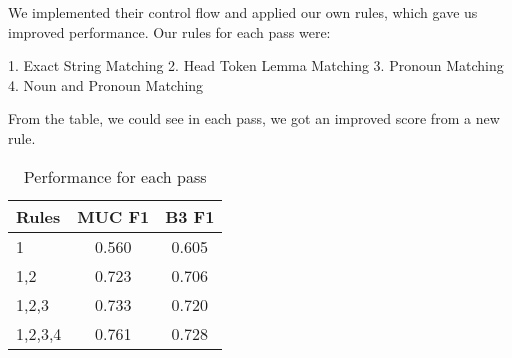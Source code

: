 \documentclass[12pt, twocolumn]{article}
\begin{document}
We implemented their control flow and applied our own rules, which gave us improved performance. Our rules for each pass were:

1. Exact String Matching
2. Head Token Lemma Matching
3. Pronoun Matching
4. Noun and Pronoun Matching

From the table, we could see in each pass, we got an improved score from a new rule.
\begin{table}[H]
\centering
\label{extra}
\begin{tabular}[t]{l|c|c}
	\hline
	Rules & MUC F1 & B3 F1\\\hline
	1 & 0.560 & 0.605 \\\hline
	1,2 & 0.723 & 0.706 \\\hline
	1,2,3 & 0.733 & 0.720 \\\hline
	1,2,3,4 & 0.761 & 0.728\\\hline
\end{tabular}
\caption{Performance for each pass}
\end{table}
\end{document}
